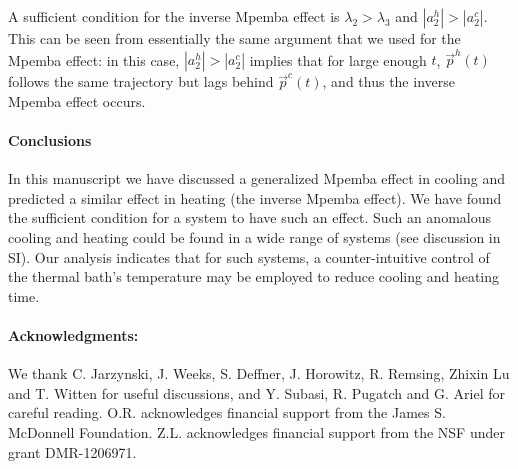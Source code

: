 \documentclass[a4paper,draft,aps,prl,preprint,superscriptaddress,nofootinbib]{revtex4}
\begin{document}
A sufficient condition for the inverse Mpemba effect is $\lambda_2>\lambda_3$ and $|a_2^h|>|a_2^c|$. This can be seen from essentially the same argument that we used for the Mpemba effect: in this case, $|a_2^h|>|a_2^c|$ implies that for large enough $t$, $\vec p^h(t)$ follows the same trajectory but lags behind $\vec p^c(t)$, and thus the inverse Mpemba effect occurs.


		
	


\paragraph{Conclusions} In this manuscript we have discussed a generalized Mpemba effect in cooling and predicted a similar effect in heating (the inverse Mpemba effect). We have found the sufficient condition for a system to have such an effect. Such an anomalous cooling and heating  could be found in a wide range of systems (see discussion in SI). Our analysis indicates that for such systems, a counter-intuitive control of the thermal bath's temperature may be employed to reduce cooling and heating time.

		
		
		\paragraph{Acknowledgments:} We thank C. Jarzynski, J. Weeks, S. Deffner, J. Horowitz, R. Remsing, Zhixin Lu  and T. Witten for useful discussions, and Y. Subasi, R. Pugatch and G. Ariel for careful reading. O.R. acknowledges financial support from the James S. McDonnell Foundation. Z.L. acknowledges financial support from the NSF under grant DMR-1206971.
		
\end{document}
